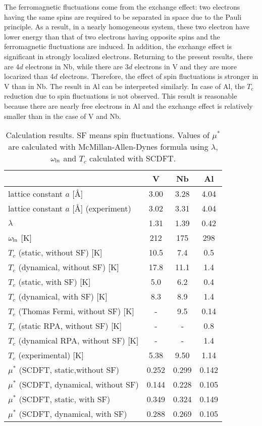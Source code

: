 The ferromagnetic fluctuations come from the exchange effect\cite{Berk1966}: two electrons having the 
same spins are 
required to be separated in space due to the Pauli principle. As a result, in a 
nearly homogeneous system, these two electron have lower energy than that of two electrons having 
opposite spins and the ferromagnetic fluctuations are induced.
In addition, the exchange effect is significant in strongly localized electrons.
Returning to the present results, there are 4$d$ electrons in Nb, while there are 3$d$ electrons 
in V and they are more locarized than 4$d$ electrons. Therefore, the effect of spin fluctuations
is stronger in V than in Nb.
The result in Al can be interpreted similarly. In case of Al, the $T_c$ reduction due to spin fluctuations
is not observed. This result is reasonable because there are nearly free electrons in Al and the
exchange effect is relatively smaller than in the case of V and Nb.
%
\begin{table}[htbp]
	\centering
	\caption{Calculation results. SF means spin fluctuations. Values of $\mu^{\ast}$ are 
	calculated with McMillan-Allen-Dynes formula using $\lambda$, $\omega_{\rm ln}$ and 
	$T_c$ calculated with SCDFT.} 
	\begin{tabular}{lccc}
		\hline \hline
		& V & Nb & Al \\
		\hline
		lattice constant $a$ [\AA] & 3.00 & 3.28 & 4.04 \\
		lattice constant $a$ [\AA] (experiment) & 3.02\cite{Kuentzler1985} & 3.31\cite{Laesser1985} & 4.04\cite{Sumiyama1990} \\
		\hline
		$\lambda$ & 1.31 & 1.39 & 0.42 \\
		$\omega_{\rm ln}$ [K] & 212 & 175 & 298 \\
		\hline
		$T_c$ (static, without SF) [K] & 10.5 & 7.4 & 0.5 \\
		$T_c$ (dynamical, without SF) [K] & 17.8 & 11.1 & 1.4 \\
		$T_c$ (static, with SF) [K] & 5.0 & 6.2 & 0.4 \\
		$T_c$ (dynamical, with SF) [K] & 8.3 & 8.9 & 1.4 \\
		$T_c$ (Thomas Fermi, without SF) [K] & - & 9.5\cite{Luders2005} & 0.14\cite{Luders2005} \\
		$T_c$ (static RPA, without SF) [K] & - & - & 0.8\cite{RA2013} \\
		$T_c$ (dynamical RPA, without SF) [K] & - & - & 1.4\cite{RA2013} \\
		$T_c$ (experimental)\cite{Ashcroft} [K] & 5.38 & 9.50 & 1.14 \\
		\hline
		$\mu^{\ast}$ (SCDFT, static,without SF) & 0.252 & 0.299 & 0.142 \\
		$\mu^{\ast}$ (SCDFT, dynamical, without SF) & 0.144 & 0.228 & 0.105 \\
		$\mu^{\ast}$ (SCDFT, static, with SF) & 0.349 & 0.324 & 0.149 \\
		$\mu^{\ast}$ (SCDFT, dynamical, with SF) & 0.288 & 0.269 & 0.105 \\
		\hline \hline
	\end{tabular}
	\label{tab:results}
\end{table}
%

